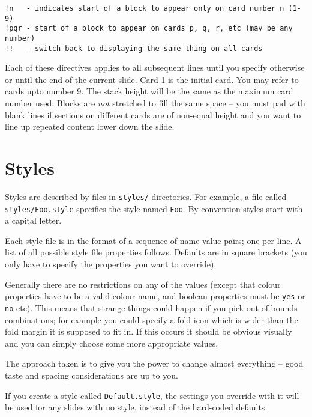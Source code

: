 \documentclass[12pt,a4paper,twoside]{article}
\renewcommand{\_}{\texttt{\symbol{95}}}
\begin{document}
\begin{verbatim}
!n   - indicates start of a block to appear only on card number n (1-9)
!pqr - start of a block to appear on cards p, q, r, etc (may be any number)
!!   - switch back to displaying the same thing on all cards
\end{verbatim}

Each of these directives applies to all subsequent lines until you
specify otherwise or until the end of the current slide.
Card 1 is the initial card. You may refer to cards upto number 9.
The stack height will be the same as the maximum card number used.
Blocks are \textit{not} stretched to fill the same space -- you must pad with
blank lines if sections on different cards are of non-equal height and
you want to line up repeated content lower down the slide.

\section{Styles}

Styles are described by files in \verb=styles/= directories. For example, a
file called \verb=styles/Foo.style= specifies the style named \verb=Foo=. By
convention styles start with a capital letter.

Each style file is in the format of a sequence of name-value pairs; one per
line. A list of all possible style file properties follows. Defaults are in
square brackets (you only have to specify the properties you want to override).

Generally there are no restrictions on any of the values (except that colour
properties have to be a valid colour name, and boolean properties must be
\verb=yes= or \verb=no= etc).
This means that strange things could happen if you pick
out-of-bounds combinations; for example you could specify a fold icon which is
wider than the fold margin it is supposed to fit in. If this occurs it should
be obvious visually and you can simply choose some more appropriate values.

The approach taken is to give you the power to change almost everything -- good
taste and spacing considerations are up to you.

If you create a style called \verb=Default.style=, the settings you override
with it will be used for any slides with no style, instead of the
hard-coded defaults.
\end{document}
